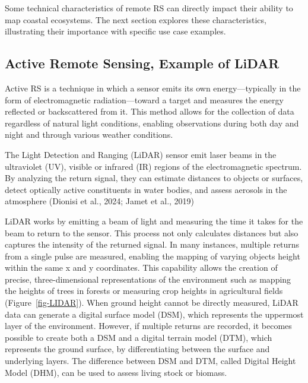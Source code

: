 \documentclass[
  letterpaper,
  11pt,
  english,
  singlespacing,
  headsepline]{MastersDoctoralThesis}
\begin{document}
\begin{spacing}{1.5}
\begin{tcolorbox}
Some technical characteristics of remote RS can directly impact their ability to map coastal ecosystems. The next section explores these characteristics, illustrating their importance with specific use case examples.
\end{tcolorbox}

\subsection{Active Remote Sensing, Example of
LiDAR}\label{active-remote-sensing-example-of-lidar}

Active RS is a technique in which a sensor emits its own
energy---typically in the form of electromagnetic radiation---toward a
target and measures the energy reflected or backscattered from it. This
method allows for the collection of data regardless of natural light
conditions, enabling observations during both day and night and through
various weather conditions.

The Light Detection and Ranging (LiDAR) sensor emit laser beams in the
ultraviolet (UV), visible or infrared (IR) regions of the
electromagnetic spectrum. By analyzing the return signal, they can
estimate distances to objects or surfaces, detect optically active
constituents in water bodies, and assess aerosols in the atmosphere
(Dionisi et al., 2024; Jamet et al., 2019)

LiDAR works by emitting a beam of light and measuring the time it takes
for the beam to return to the sensor. This process not only calculates
distances but also captures the intensity of the returned signal. In
many instances, multiple returns from a single pulse are measured,
enabling the mapping of varying objects height within the same x and y
coordinates. This capability allows the creation of precise,
three-dimensional representations of the environment such as mapping the
heights of trees in forests or measuring crop heights in agricultural
fields (Figure~\ref{fig-LIDAR}). When ground height cannot be directly
measured, LiDAR data can generate a digital surface model (DSM), which
represents the uppermost layer of the environment. However, if multiple
returns are recorded, it becomes possible to create both a DSM and a
digital terrain model (DTM), which represents the ground surface, by
differentiating between the surface and underlying layers. The
difference between DSM and DTM, called Digital Height Model (DHM), can
be used to assess living stock or biomass.


\end{spacing}
\end{document}
